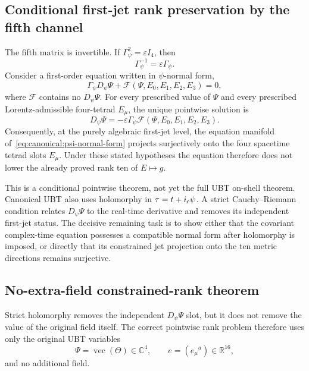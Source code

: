 \subsection{Conditional first-jet rank preservation by the fifth channel}
The fifth matrix is invertible.  If $\Gamma_\psi^2=\varepsilon I_4$, then
\begin{equation}
 \Gamma_\psi^{-1}=\varepsilon\Gamma_\psi.
\end{equation}
Consider a first-order equation written in $\psi$-normal form,
\begin{equation}
 \Gamma_\psi D_\psi\Psi
 +\mathcal F(\Psi,E_0,E_1,E_2,E_3)=0,
 \label{eq:canonical:psi-normal-form}
\end{equation}
where $\mathcal F$ contains no $D_\psi\Psi$.  For every prescribed value of
$\Psi$ and every prescribed Lorentz-admissible four-tetrad $E_\mu$, the unique
pointwise solution is
\begin{equation}
 \boxed{
 D_\psi\Psi
 =-\varepsilon\Gamma_\psi
   \mathcal F(\Psi,E_0,E_1,E_2,E_3).}
 \label{eq:canonical:psi-normal-solution}
\end{equation}
Consequently, at the purely algebraic first-jet level, the equation manifold
of~\eqref{eq:canonical:psi-normal-form} projects surjectively onto the four
spacetime tetrad slots $E_\mu$.  Under these stated hypotheses the equation
therefore does not lower the already proved rank ten of $E\mapsto g$.

This is a conditional pointwise theorem, not yet the full UBT on-shell theorem.
Canonical UBT also uses holomorphy in $\tau=t+i_{\rm c}\psi$.  A strict
Cauchy--Riemann condition relates $D_\psi\Psi$ to the real-time derivative and
removes its independent first-jet status.  The decisive remaining task is to
show either that the covariant complex-time equation possesses a compatible
normal form after holomorphy is imposed, or directly that its constrained jet
projection onto the ten metric directions remains surjective.


\subsection{No-extra-field constrained-rank theorem}
Strict holomorphy removes the independent $D_\psi\Psi$ slot, but it does not
remove the value of the original field itself.  The correct pointwise rank
problem therefore uses only the original UBT variables
\begin{equation}
 \Psi=\operatorname{vec}(\Theta)\in\mathbb C^4,
 \qquad
 e=(e_\mu{}^a)\in\mathbb R^{16},
\end{equation}
and no additional field.

